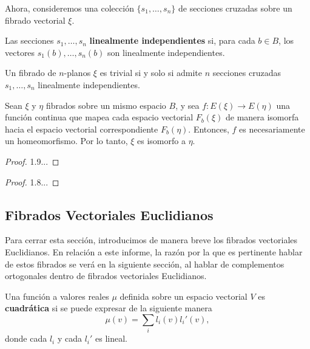 Ahora, consideremos una colección $\{ s_{1}, \dots, s_{n} \}$ de secciones cruzadas sobre un fibrado vectorial $\xi$.

\begin{definition}
	Las secciones $s_{1},\dots,s_{n}$ \textbf{linealmente independientes} si, para cada $b \in B$, los vectores $s_{1}(b), \dots, s_{n}(b)$ son linealmente independientes.
\end{definition}


\begin{theorem}
	Un fibrado de $n$-planos $\xi$ es trivial si y solo si admite $n$ secciones cruzadas $s_{1},\dots,s_{n}$ linealmente independientes.
\end{theorem}

\begin{lemma}
	Sean $\xi$ y $\eta$ fibrados sobre un mismo espacio $B$, y sea $f \colon E(\xi) \to E(\eta)$ una función continua que mapea cada espacio vectorial $F_{b}(\xi)$ de manera isomorfa hacia el espacio vectorial correspondiente $F_{b}(\eta)$. Entonces, $f$ es necesariamente un homeomorfismo. Por lo tanto, $\xi$ es isomorfo a $\eta$.
\end{lemma}

\begin{proof}
	1.9...
\end{proof}

\begin{proof}
	1.8...
\end{proof}

\subsection{Fibrados Vectoriales Euclidianos}

Para cerrar esta sección, introducimos de manera breve los fibrados vectoriales Euclidianos. En relación a este informe, la razón por la que es pertinente hablar de estos fibrados se verá en la siguiente sección, al hablar de complementos ortogonales dentro de fibrados vectoriales Euclidianos.

\begin{definition}
	Una función a valores reales $\mu$ definida sobre un espacio vectorial $V$ es \textbf{cuadrática} si se puede expresar de la siguiente manera
	\[ \mu(v) = \sum_{i}l_{i}(v) l_{i}'(v), \]
	donde cada $l_{i}$ y cada $l_{i}'$ es lineal.
\end{definition}

